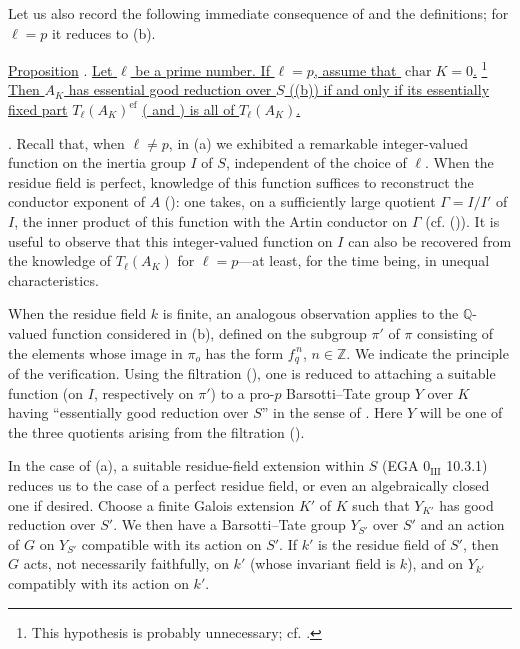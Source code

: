 Let us also record the following immediate consequence of  and the
definitions; for $\ell=p$ it reduces to (b).

\medskip
\noindent
\underline{Proposition} . \underline{Let $\ell$ be a prime
number.  If $\ell=p$, assume that $\operatorname{char}K=0$.}
\footnote{This hypothesis is probably unnecessary; cf. .}
\underline{Then $A_K$ has essential good reduction over $S$ ((b))
if and only if its essentially fixed part}
$T_\ell(A_K)^{\mathrm{ef}}$
\underline{( and ) is all of $T_\ell(A_K)$.}

\medskip
\noindent
{}. Recall that, when $\ell\neq p$, in (a) we exhibited a
remarkable integer-valued function on the inertia group $I$ of $S$,
independent of the choice of $\ell$.  When the residue field is perfect,
knowledge of this function suffices to reconstruct the conductor
exponent of $A$ (): one takes, on a sufficiently large quotient
$\Gamma=I/I'$ of $I$, the inner product of this function with the Artin
conductor on $\Gamma$ (cf. ()).  It is useful to observe that this
integer-valued function on $I$ can also be recovered from the knowledge
of $T_\ell(A_K)$ for $\ell=p$---at least, for the time being, in unequal
characteristics.

When the residue field $k$ is finite, an analogous observation applies
to the $\mathbb Q$-valued function considered in (b), defined on the
subgroup $\pi'$ of $\pi$ consisting of the elements whose image in
$\pi_o$ has the form $f_q^{\,n}$, $n\in\mathbb Z$.  We indicate the
principle of the verification.  Using the filtration (), one is
reduced to attaching a suitable function (on $I$, respectively on
$\pi'$) to a pro-$p$ Barsotti--Tate group $Y$ over $K$ having
``essentially good reduction over $S$'' in the sense of .  Here $Y$
will be one of the three quotients arising from the filtration ().

In the case of (a), a suitable residue-field extension within $S$
(EGA $0_{\mathrm{III}}$ 10.3.1) reduces us to the case of a perfect
residue field, or even an algebraically closed one if desired.  Choose
a finite Galois extension $K'$ of $K$ such that $Y_{K'}$ has good
reduction over $S'$.  We then have a Barsotti--Tate group $Y_{S'}$ over
$S'$ and an action of $G$ on $Y_{S'}$ compatible with its action on
$S'$.  If $k'$ is the residue field of $S'$, then $G$ acts, not
necessarily faithfully, on $k'$ (whose invariant field is $k$), and on
$Y_{k'}$ compatibly with its action on $k'$.

